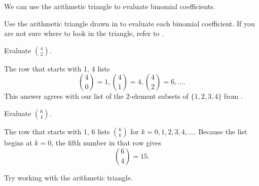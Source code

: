 We can use the arithmetic triangle to evaluate binomial coefficients.

\begin{exam}
\label{exam_using_arith_tri_eval}
    Use the arithmetic triangle drawn in  to evaluate each binomial coefficient.  If you are not sure where to look in the triangle, refer to .
        \begin{apart}
            \item Evaluate $\displaystyle \binom{4}{2}$.
                \begin{soln}
                    The row that starts with 1, 4 lists $$\binom{4}{0}=1, \binom{4}{1}=4, \binom{4}{2}=6, \ldots.$$  This answer agrees with our list of the 2-element subsets of $\{1,2,3,4\}$ from .
                \end{soln}
            \item Evaluate $\displaystyle \binom{6}{4}$.
                \begin{soln}
                    The row that starts with 1, 6 lists $\displaystyle \binom{6}{k}$ for $k=0, 1, 2, 3, 4, \ldots$. Because the list begins at $k=0$,  the fifth number in that row gives $$\displaystyle \binom{6}{4}=15.$$
                \end{soln}
        \end{apart}
\end{exam}

Try working with the arithmetic triangle.

